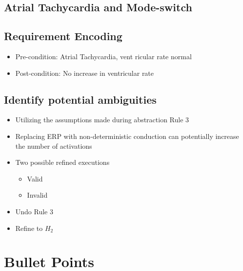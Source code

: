 \documentclass{llncs}
\begin{document}
\subsection{Atrial Tachycardia and Mode-switch}
\subsection{Requirement Encoding}
\begin{itemize}
	\item Pre-condition: Atrial Tachycardia, vent  ricular rate normal
    \item Post-condition: No increase in ventricular rate
\end{itemize}
\subsection{Identify potential ambiguities}

\begin{itemize}
	\item Utilizing the assumptions made during abstraction Rule 3
    \item Replacing ERP with non-deterministic conduction can potentially increase the number of activations
    \item Two possible refined executions
    
\begin{itemize}
	\item Valid 
    \item Invalid
\end{itemize}
    \item Undo Rule 3
    \item Refine to $H_2$
\end{itemize}
\newpage
\section{Bullet Points}
\end{document}
